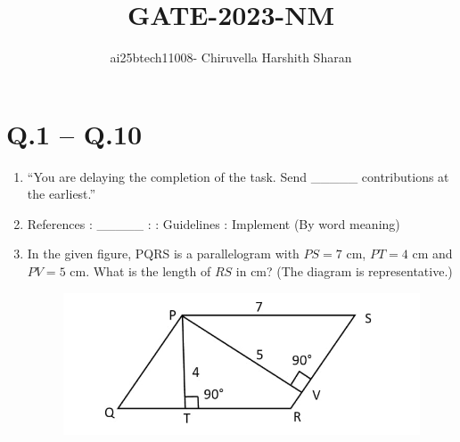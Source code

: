 \documentclass[journal,12pt,onecolumn]{IEEEtran}
\title{\huge {GATE-2023-NM}}
\author{ai25btech11008- Chiruvella Harshith Sharan}
\date{}
\theoremstyle{remark}
\begin{document}
\maketitle

\setlength{\parindent}{0pt}
\setlength{\parskip}{0.5cm}

\section*{Q.1 -- Q.10}

\begin{enumerate}
\item ``You are delaying the completion of the task. Send \_\_\_\_\_ contributions at the earliest.'' \hfill{}

\begin{enumerate}[label=\Alph*.]
\end{enumerate}

\item References : \_\_\_\_\_ : : Guidelines : Implement (By word meaning) \hfill{}

\begin{enumerate}[label=\Alph*.]
\end{enumerate}

\item In the given figure, PQRS is a parallelogram with $PS = 7$ cm, $PT = 4$ cm and $PV = 5$ cm.  
What is the length of $RS$ in cm? (The diagram is representative.) \hfill{}

\begin{figure}[H]
    \centering
    \includegraphics[scale=0.5]{figs/q3.jpg}
    \caption{}
    \label{fig:figure1}
\end{figure}


\end{enumerate}
\end{document}
